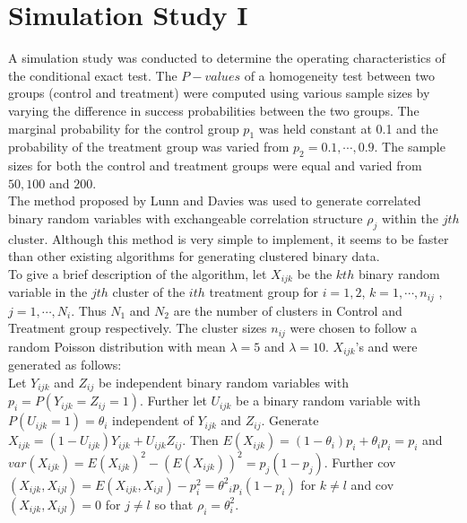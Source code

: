 \documentclass[12pt,oneside]{report}
\theoremstyle{definition}
\theoremstyle{mystyle}
\begin{document}
\section{Simulation Study I}
A simulation study was conducted to determine the operating characteristics of the conditional exact test. The $P-values$ of  a homogeneity test between two groups (control and treatment)  were computed using various sample sizes by varying the difference in success probabilities between the two groups.
The marginal probability for the control group   $p_{1}$ was held constant at 0.1 and the probability of the treatment group was varied from $p_{2}=0.1,\cdots,0.9$. The sample sizes for  both the control and treatment groups were equal and varied  from $50,100$ and $200$. \\

The method proposed by Lunn and Davies \cite{lunn} was used to generate correlated binary random variables with exchangeable correlation structure  $\rho_{j}$ within the $jth$ cluster. Although this method is very  simple to implement, it seems to be faster than  other existing algorithms for generating clustered binary data.\\

To give a brief description of the algorithm, let $X_{ijk}$  be  the $kth$ binary  random variable in the $jth$ cluster of the $ith$ treatment group  for $i=1,2$, $k=1,\cdots,n_{ij}$ ,$j=1,\cdots,N_{i}$. Thus $N_{1}$ and $N_{2}$ are the number of clusters in Control and Treatment group respectively. The cluster sizes $n_{ij}$ were chosen to follow a random Poisson distribution with mean $\lambda=5$ and $\lambda=10$. $X_{ijk}$'s and were generated as follows:\\
Let $Y_{ijk}$ and $Z_{ij}$ be independent binary random variables with $p_{i}=P(Y_{ijk} = Z_{ij}=1)$. Further let $U_{ijk}$ be a binary random variable with $P(U_{ijk}=1)=\theta_{i}$ independent of $Y_{ijk}$ and $Z_{ij}$. Generate $X_{ijk}=(1-U_{ijk})Y_{ijk}+U_{ijk}Z_{ij}$. Then $E(X_{ijk})=(1-\theta_{i})p_{i}+\theta_{i}p_{i}=p_{i}$ and $var(X_{ijk})=E(X_{ijk})^{2}-(E(X_{ijk})^{})^{2}=p_{j}(1-p_{j})$. Further cov$(X_{ijk},X_{ijl})=E(X_{ijk},X_{ijl})-p_{i}^{2}=\theta^{2}{_{i}} p_{i}(1-p_{i})$ for $k\neq l$ and cov$(X_{ijk},X_{ijl})=0$ for $j\neq l$ so that $\rho_{i}=\theta_{i}^{2}$.\\
\end{document}
